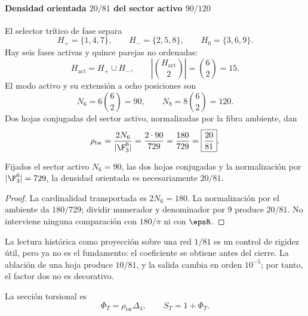 
\paragraph{Densidad orientada \(20/81\) del sector activo \(90/120\)}

El selector trítico de fase separa
\[
H_+=\{1,4,7\},\qquad H_-=\{2,5,8\},\qquad H_0=\{3,6,9\}.
\]
Hay seis fases activas y quince parejas no ordenadas:
\[
H_{\mathrm{act}}=H_+\cup H_-,\qquad
\left|\binom{H_{\mathrm{act}}}2\right|=\binom62=15.
\]
El modo activo y su extensión a ocho posiciones son
\begin{equation}
N_6=6\binom62=90,\qquad
N_8=8\binom62=120.
\label{eq:90-120-incidencia}
\end{equation}
Dos hojas conjugadas del sector activo, normalizadas por la fibra ambiente,
dan
\begin{equation}
\rho_{\mathrm{tw}}
=\frac{2N_6}{|\F_3^6|}
=\frac{2\cdot90}{729}
=\frac{180}{729}
=\boxed{\frac{20}{81}}.
\label{eq:rho-twoway}
\end{equation}

\begin{proposition}
Fijados el sector activo \(N_6=90\), las dos hojas conjugadas y la
normalización por \(|\F_3^6|=729\), la densidad orientada es necesariamente
\(20/81\).
\end{proposition}
\begin{proof}
La cardinalidad transportada es \(2N_6=180\). La normalización por el ambiente
da \(180/729\); dividir numerador y denominador por \(9\) produce \(20/81\).
No interviene ninguna comparación con \(180/\pi\) ni con \(\epsR\).
\end{proof}

La lectura histórica como proyección sobre una red \(1/81\) es un control de
rigidez útil, pero ya no es el fundamento: el coeficiente se obtiene antes
del cierre. La ablación de una hoja produce \(10/81\), y la salida cambia en
orden \(10^{-5}\); por tanto, el factor dos no es decorativo.

La sección torsional es
\begin{equation}
\Phi_T=\rho_{\mathrm{tw}}\Delta_4,
\qquad
S_T=1+\Phi_T.
\label{eq:seccion-torsional}
\end{equation}

